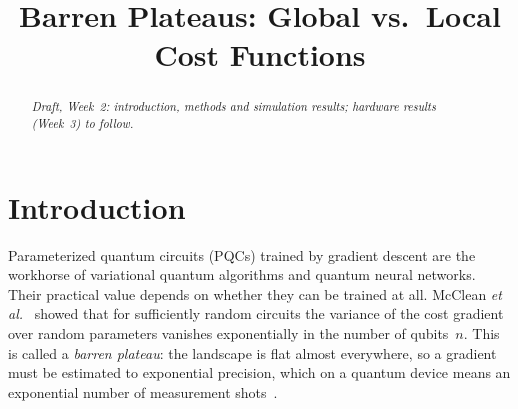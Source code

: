 \documentclass[conference]{IEEEtran}
\begin{document}
\title{Barren Plateaus: Global vs.\ Local Cost Functions}

\author{
}

\maketitle

\begin{abstract}
\emph{Draft, Week~2: introduction, methods and simulation results; hardware
results (Week~3) to follow.}
\end{abstract}

\section{Introduction}
Parameterized quantum circuits (PQCs) trained by gradient descent are the
workhorse of variational quantum algorithms and quantum neural networks. Their
practical value depends on whether they can be trained at all. McClean
\emph{et al.}~\cite{mcclean2018} showed that for sufficiently random circuits
the variance of the cost gradient over random parameters vanishes
exponentially in the number of qubits~$n$. This is called a \emph{barren
plateau}: the landscape is flat almost everywhere, so a gradient must be
estimated to exponential precision, which on a quantum device means an
exponential number of measurement shots~\cite{larocca2025}.
\end{document}
